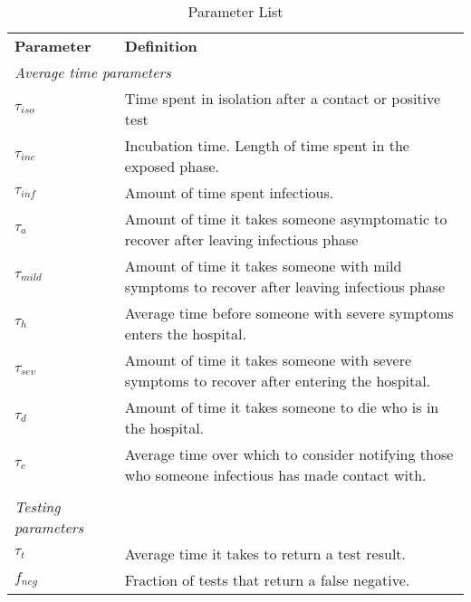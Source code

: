 \documentclass[notitlepage, superscriptaddress]{revtex4-2}
\begin{document}
\begin{table}[]
\caption{Parameter List}
\label{tab:parameters}
\begin{tabular}{ll}
\textbf{Parameter}          & \textbf{Definition}                                                                                \\
\multicolumn{2}{l}{\textit{Average time parameters}}                                                                             \\
$\tau_{iso}$                & Time spent in isolation after a contact or positive test                                           \\
$\tau_{inc}$                & Incubation time. Length of time spent in the exposed phase.                                        \\
$\tau_{inf}$                & Amount of time spent infectious.                                                                   \\
$\tau_{a}$                  & Amount of time it takes someone asymptomatic to recover after leaving infectious phase             \\
$\tau_{mild}$               & Amount of time it takes someone with mild symptoms to recover after leaving infectious phase       \\
$\tau_{h}$                  & Average time before someone with severe symptoms enters the hospital.                              \\
$\tau_{sev}$                & Amount of time it takes someone with severe symptoms to recover after entering the hospital.       \\
$\tau_{d}$                  & Amount of time it takes someone to die who is in the hospital.                                     \\
$\tau_{c}$          & Average time over which to consider notifying those who someone infectious has made contact with.        \\
                            &                                                                                                    \\
\textit{Testing parameters} &                                                                                                    \\
$\tau_{t}$                  & Average time it takes to return a test result.                                                     \\
$f_{neg}$                   & Fraction of tests that return a false negative.                                                    \\

\end{tabular}
\end{table}
\end{document}
